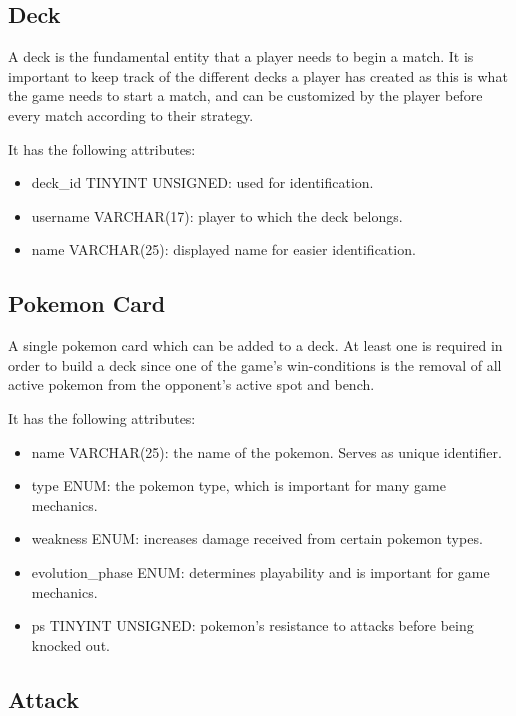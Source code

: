 \documentclass{article}
\begin{document}
\subsection{Deck}

A deck is the fundamental entity that a player needs to begin a match. It is 
important to keep track of the different decks a player has created as this is 
what the game needs to start a match, and can be customized by the player 
before every match according to their strategy.

It has the following attributes:

\begin{itemize}
    \item deck\_id  TINYINT UNSIGNED: used for identification.
    \item username VARCHAR(17): player to which the deck belongs.
    \item name VARCHAR(25): displayed name for easier identification.
\end{itemize}

\subsection{Pokemon Card}

A single pokemon card which can be added to a deck. At least one is required 
in order to build a deck since one of the game's win-conditions is the 
removal of all active pokemon from the opponent's active spot and bench.

It has the following attributes:

\begin{itemize}
    \item name VARCHAR(25): the name of the pokemon. Serves as unique identifier.
    \item type ENUM: the pokemon type, which is important for many game mechanics.
    \item weakness ENUM: increases damage received from certain pokemon types.
    \item evolution\_phase ENUM: determines playability and is important for game 
        mechanics.
    \item ps TINYINT UNSIGNED: pokemon's resistance to attacks before being knocked 
        out.
\end{itemize}

\subsection{Attack}
\end{document}
